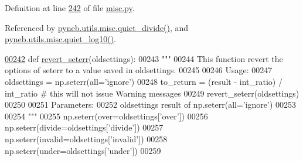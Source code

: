 Definition at line \hyperlink{misc_8py_source_l00242}{242} of file \hyperlink{misc_8py_source}{misc.\+py}.



Referenced by \hyperlink{misc_8py_source_l00260}{pyneb.\+utils.\+misc.\+quiet\+\_\+divide()}, and \hyperlink{misc_8py_source_l00269}{pyneb.\+utils.\+misc.\+quiet\+\_\+log10()}.


\begin{DoxyCode}
\hypertarget{namespacepyneb_1_1utils_1_1misc_l00242}{}\hyperlink{namespacepyneb_1_1utils_1_1misc_adadbbcc030d1e6da419e5c7af03f5a2d}{00242} \textcolor{keyword}{def }\hyperlink{namespacepyneb_1_1utils_1_1misc_adadbbcc030d1e6da419e5c7af03f5a2d}{revert\_seterr}(oldsettings):
00243     \textcolor{stringliteral}{"""}
00244 \textcolor{stringliteral}{    This function revert the options of seterr to a value saved in oldsettings.}
00245 \textcolor{stringliteral}{    }
00246 \textcolor{stringliteral}{    Usage:}
00247 \textcolor{stringliteral}{        oldsettings = np.seterr(all='ignore')}
00248 \textcolor{stringliteral}{        to\_return = (result - int\_ratio) / int\_ratio # this will not issue Warning messages}
00249 \textcolor{stringliteral}{        revert\_seterr(oldsettings)}
00250 \textcolor{stringliteral}{}
00251 \textcolor{stringliteral}{    Parameters:}
00252 \textcolor{stringliteral}{        oldsettings  result of np.seterr(all='ignore')}
00253 \textcolor{stringliteral}{}
00254 \textcolor{stringliteral}{    """}
00255     np.seterr(over=oldsettings[\textcolor{stringliteral}{'over'}])
00256     np.seterr(divide=oldsettings[\textcolor{stringliteral}{'divide'}])
00257     np.seterr(invalid=oldsettings[\textcolor{stringliteral}{'invalid'}])
00258     np.seterr(under=oldsettings[\textcolor{stringliteral}{'under'}])
00259 
\end{DoxyCode}
\hypertarget{namespacepyneb_1_1utils_1_1misc_a97329c3ce57bd870421672b90e3e6541}{}
